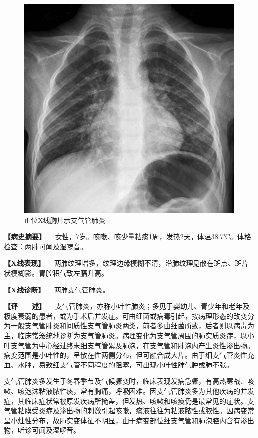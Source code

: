 \begin{figure}[!htbp]
 \centering
 \includegraphics{./images/Image00150.jpg}
 \captionsetup{justification=centering}
 \caption{正位X线胸片示支气管肺炎}
 \label{fig3-4-2}
  \end{figure} 

\textbf{【病史摘要】}
　女性，7岁。咳嗽、咳少量粘痰1周，发热2天，体温38.7℃。体格检查：两肺可闻及湿啰音。

\textbf{【X线表现】}
　两肺纹理增多，纹理边缘模糊不清，沿肺纹理见散在斑点、斑片状模糊影。胃腔积气致左膈升高。

\textbf{【X线诊断】} 　两肺支气管肺炎。

\textbf{【评　　述】}
　支气管肺炎，亦称小叶性肺炎；多见于婴幼儿、青少年和老年及极度衰弱的患者，或为手术后并发症。可由细菌或病毒引起，按病理形态的改变分为一般支气管肺炎和间质性支气管肺炎两类，前者多由细菌所致，后者则以病毒为主，临床常笼统地诊断为支气管肺炎。病理变化为支气管周围的肺实质炎症，以小叶支气管为中心经过终末细支气管累及肺泡，在支气管和肺泡内产生炎性渗出物。病变范围是小叶性的，呈散在性两侧分布，但可融合成大片。由于细支气管炎性充血、水肿，易致细支气管不同程度的阻塞，可出现小叶性肺气肿或肺不张。

支气管肺炎多发生于冬春季节及气候骤变时，临床表现发病急骤，有高热寒战、咳嗽、咳泡沫粘液脓性痰，常有胸痛，呼吸困难。因支气管肺炎多为其他疾病的并发症，其临床症状常被原发疾病所掩盖，但发热、咳嗽和咳痰仍是最常见的症状。支气管粘膜受炎症及渗出物的刺激引起咳嗽，痰液往往为粘液脓性或脓性。因病变常呈小灶性分布，故肺实变体征不明显，由于病变部位细支气管和肺泡腔内含有渗出物，听诊可闻及湿啰音。

